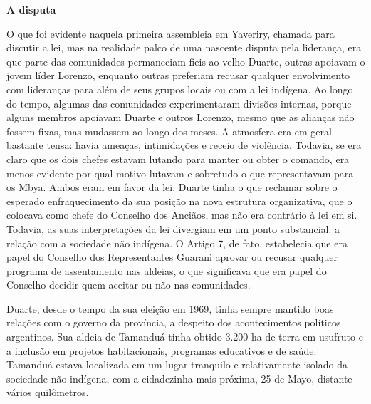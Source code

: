 \textbf{A disputa}

O que foi evidente naquela primeira assembleia em Yaveriry, chamada para
discutir a lei, mas na realidade palco de uma nascente disputa pela
liderança, era que parte das comunidades permaneciam fieis ao velho
Duarte, outras apoiavam o jovem líder Lorenzo, enquanto outras preferiam
recusar qualquer envolvimento com lideranças para além de seus grupos
locais ou com a lei indígena. Ao longo do tempo, algumas das comunidades
experimentaram divisões internas, porque alguns membros apoiavam Duarte
e outros Lorenzo, mesmo que as alianças não fossem fixas, mas mudassem
ao longo dos meses. A atmosfera era em geral bastante tensa: havia
ameaças, intimidações e receio de violência. Todavia, se era claro que
os dois chefes estavam lutando para manter ou obter o comando, era menos
evidente por qual motivo lutavam e sobretudo o que representavam para os
Mbya. Ambos eram em favor da lei. Duarte tinha o que reclamar sobre o
esperado enfraquecimento da sua posição na nova estrutura organizativa,
que o colocava como chefe do Conselho dos Anciãos, mas não era contrário
à lei em si. Todavia, as suas interpretações da lei divergiam em um
ponto substancial: a relação com a sociedade não indígena. O Artigo 7,
de fato, estabelecia que era papel do Conselho dos Representantes
Guarani aprovar ou recusar qualquer programa de assentamento nas
aldeias, o que significava que era papel do Conselho decidir quem
aceitar ou não nas comunidades.

Duarte, desde o tempo da sua eleição em 1969, tinha sempre mantido boas
relações com o governo da província, a despeito dos acontecimentos
políticos argentinos. Sua aldeia de Tamanduá tinha obtido 3.200 ha de
terra em usufruto e a inclusão em projetos habitacionais, programas
educativos e de saúde. Tamanduá estava localizada em um lugar tranquilo
e relativamente isolado da sociedade não indígena, com a cidadezinha
mais próxima, 25 de Mayo, distante vários quilômetros.

